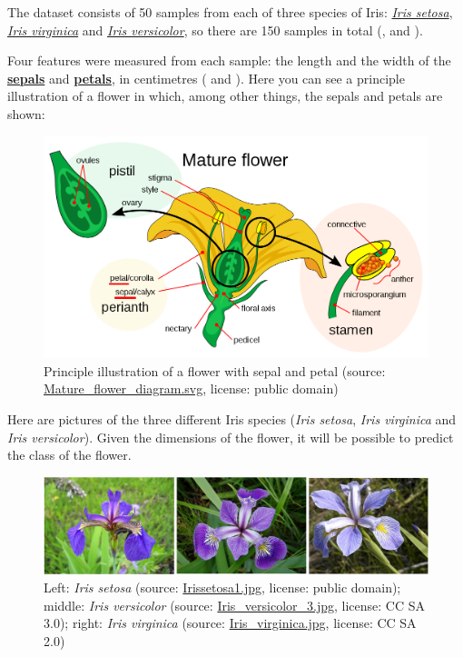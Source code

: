 \documentclass [oneside,10pt,a4paper,ngerman,BCOR10mm,headsepline,parindent,final]{scrartcl}
\begin{document}
The dataset consists of 50 samples from each of three species of Iris:
\href{https://en.wikipedia.org/wiki/Iris_setosa}{\emph{Iris setosa}},
\href{https://en.wikipedia.org/wiki/Iris_virginica}{\emph{Iris
virginica}} and
\href{https://en.wikipedia.org/wiki/Iris_versicolor}{\emph{Iris
versicolor}}, so there are 150 samples in total
(\cite{Wiki_Iris_setosa}, \cite{Wiki_Iris_virginica} and
\cite{Wiki_Iris_versicolor}).

Four features were measured from each sample: the length and the width
of the \textbf{\href{https://en.wikipedia.org/wiki/Sepal}{sepals}} and
\textbf{\href{https://en.wikipedia.org/wiki/Petal}{petals}}, in
centimetres (\cite{Wiki_Sepal} and \cite{Wiki_Petal}). Here you can see
a principle illustration of a flower in which, among other things, the
sepals and petals are shown:

    \begin{figure}
\centering
\includegraphics{images/Mature_flower_diagram_1024px.png}
\caption{Principle illustration of a flower with sepal and petal
(source:
\href{https://en.wikipedia.org/wiki/File:Mature_flower_diagram.svg}{Mature\_flower\_diagram.svg},
license: public domain)}
\end{figure}

    Here are pictures of the three different Iris species (\emph{Iris
setosa}, \emph{Iris virginica} and \emph{Iris versicolor}). Given the
dimensions of the flower, it will be possible to predict the class of
the flower.

    \begin{figure}
\centering
\includegraphics{images/Iris_images.png}
\caption{Left: \emph{Iris setosa} (source:
\href{https://commons.wikimedia.org/wiki/File:Irissetosa1.jpg}{Irissetosa1.jpg},
license: public domain); middle: \emph{Iris versicolor} (source:
\href{https://en.wikipedia.org/wiki/File:Iris_versicolor_3.jpg}{Iris\_versicolor\_3.jpg},
license: CC SA 3.0); right: \emph{Iris virginica} (source:
\href{https://en.wikipedia.org/wiki/File:Iris_virginica.jpg}{Iris\_virginica.jpg},
license: CC SA 2.0)}
\end{figure}
\end{document}
